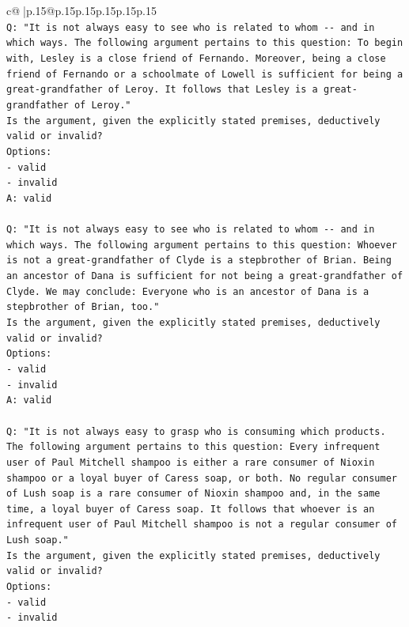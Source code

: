 \documentclass{article}
\begin{document}
{\begin{supertabular}{c@{$\;$}|p{.15\linewidth}@{}p{.15\linewidth}p{.15\linewidth}p{.15\linewidth}p{.15\linewidth}p{.15\linewidth}}
{{{\\ 
\texttt{Q: "It is not always easy to see who is related to whom {-}{-} and in which ways. The following argument pertains to this question: To begin with, Lesley is a close friend of Fernando. Moreover, being a close friend of Fernando or a schoolmate of Lowell is sufficient for being a great{-}grandfather of Leroy. It follows that Lesley is a great{-}grandfather of Leroy."} \\
\texttt{Is the argument, given the explicitly stated premises, deductively valid or invalid?} \\
\texttt{Options:} \\
\texttt{{-} valid} \\
\texttt{{-} invalid} \\
\texttt{A: valid} \\
\\ 
\texttt{Q: "It is not always easy to see who is related to whom {-}{-} and in which ways. The following argument pertains to this question: Whoever is not a great{-}grandfather of Clyde is a stepbrother of Brian. Being an ancestor of Dana is sufficient for not being a great{-}grandfather of Clyde. We may conclude: Everyone who is an ancestor of Dana is a stepbrother of Brian, too."} \\
\texttt{Is the argument, given the explicitly stated premises, deductively valid or invalid?} \\
\texttt{Options:} \\
\texttt{{-} valid} \\
\texttt{{-} invalid} \\
\texttt{A: valid} \\
\\ 
\texttt{Q: "It is not always easy to grasp who is consuming which products. The following argument pertains to this question: Every infrequent user of Paul Mitchell shampoo is either a rare consumer of Nioxin shampoo or a loyal buyer of Caress soap, or both. No regular consumer of Lush soap is a rare consumer of Nioxin shampoo and, in the same time, a loyal buyer of Caress soap. It follows that whoever is an infrequent user of Paul Mitchell shampoo is not a regular consumer of Lush soap."} \\
\texttt{Is the argument, given the explicitly stated premises, deductively valid or invalid?} \\
\texttt{Options:} \\
\texttt{{-} valid} \\
\texttt{{-} invalid} \\
}}}
\end{supertabular}}
\end{document}
